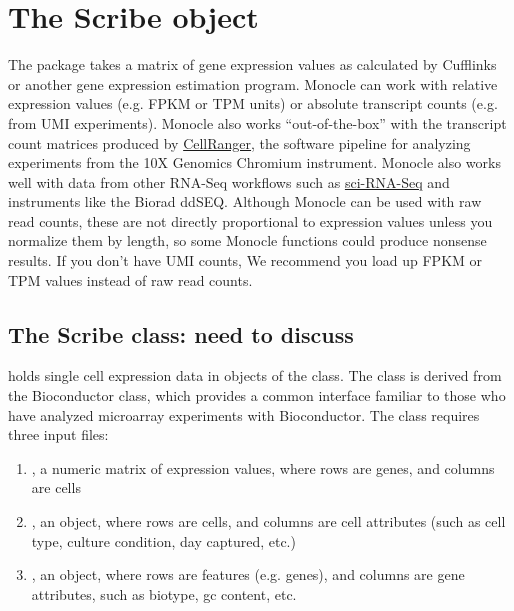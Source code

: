 \documentclass[10pt,oneside]{article}\usepackage[]{graphicx}\usepackage[]{color}
\begin{document}
 \section{The Scribe object}

 The  package takes a matrix of gene expression values as calculated by Cufflinks\cite{Trapnell:2012kp} or another gene expression estimation program. Monocle can work with relative expression values (e.g. FPKM or TPM units) or absolute transcript counts (e.g. from UMI experiments). Monocle also works ``out-of-the-box'' with the transcript count matrices produced by \href{https://support.10xgenomics.com/single-cell/software/overview/welcome}{CellRanger}, the software pipeline for analyzing experiments from the 10X Genomics Chromium instrument. Monocle also works well with data from other RNA-Seq workflows such as \href{http://biorxiv.org/content/early/2017/02/02/104844}{sci-RNA-Seq} and instruments like the Biorad ddSEQ. Although Monocle can be used with raw read counts, these are not directly proportional to expression values unless you normalize them by length, so some Monocle functions could produce nonsense results. If you don't have UMI counts, We recommend you load up FPKM or TPM values instead of raw read counts.

 \subsection{The Scribe class: need to discuss}

  holds single cell expression data in objects of the  class. The class is derived from the Bioconductor  class, which provides a common interface familiar to those who have analyzed microarray experiments with Bioconductor. The class requires three input files:
 \begin{enumerate}
 \item {}, a numeric matrix of expression values, where rows are genes, and columns are cells
 \item {}, an  object, where rows are cells, and columns are cell attributes (such as cell type, culture condition, day captured, etc.)
 \item {}, an  object, where rows are features (e.g. genes), and columns are gene attributes, such as biotype, gc content, etc.
 \end{enumerate}
\end{document}
